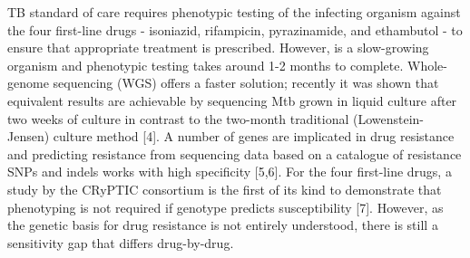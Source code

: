 TB standard of care requires phenotypic testing of the infecting organism against the four first-line drugs - isoniazid, rifampicin, pyrazinamide, and ethambutol - to ensure that appropriate treatment is prescribed. However, \mtb{} is a slow-growing organism and phenotypic testing takes around 1-2 months to complete. Whole-genome sequencing (WGS) offers a faster solution; recently it was shown that equivalent results are achievable by sequencing Mtb grown in liquid culture after two weeks of culture in contrast to the two-month traditional (Lowenstein-Jensen) culture method [4]. A number of genes are implicated in drug resistance and predicting resistance from sequencing data based on a catalogue of resistance SNPs and indels works with high specificity [5,6]. For the four first-line drugs, a study by the CRyPTIC consortium is the first of its kind to demonstrate that phenotyping is not required if genotype predicts susceptibility [7]. However, as the genetic basis for drug resistance is not entirely understood, there is still a sensitivity gap that differs drug-by-drug.




